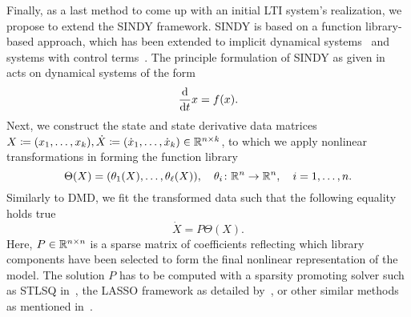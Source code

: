 Finally, as a last method to come up with an initial \ac{LTI} system's realization, we propose to extend the \ac{SINDY} framework.
\ac{SINDY} is based on a function library-based approach, which has been extended to implicit dynamical systems~\cite{Mangan2016, Kaheman2020} and systems with control terms~\cite{Kaiser2018}.
The principle formulation of \ac{SINDY} as given in~\cite{Brunton2016} acts on dynamical systems of the form
\begin{equation}\label{eq:sindy-explicit-dynamical-system}
    \frac{\mathop{}\!\mathrm{d}}{\mathop{}\!\mathrm{d} t} x = f(x).
\end{equation}
Next, we construct the state and state derivative data matrices $X \coloneqq (x_1, \dots, x_k), \dot{X} \coloneqq (\dot{x}_1, \dots, \dot{x}_k) \in \mathbb{R}^{n \times k}$, to which we apply nonlinear transformations in forming the function library
\begin{equation}\label{eq:sindy-explicit-library}
    \Theta(X) = (\theta_1(X), \dots, \theta_\ell(X)),\quad \theta_i \colon \mathbb{R}^n \to \mathbb{R}^n,\quad i = 1, \dots, n.
\end{equation}
Similarly to \ac{DMD}, we fit the transformed data such that the following equality holds true
\begin{equation}\label{eq:sindy-explicit-fit}
    \dot{X} = P \Theta(X).
\end{equation}
Here, $P \in \mathbb{R}^{n \times n}$ is a sparse matrix of coefficients reflecting which library components have been selected to form the final nonlinear representation of the model.
The solution $P$ has to be computed with a sparsity promoting solver such as \ac{STLSQ} in~\cite{Zhang2019}, the LASSO framework as detailed by~\cite{Tibshirani1996}, or other similar methods as mentioned in~\cite{Kaiser2018, Kaheman2020}.
